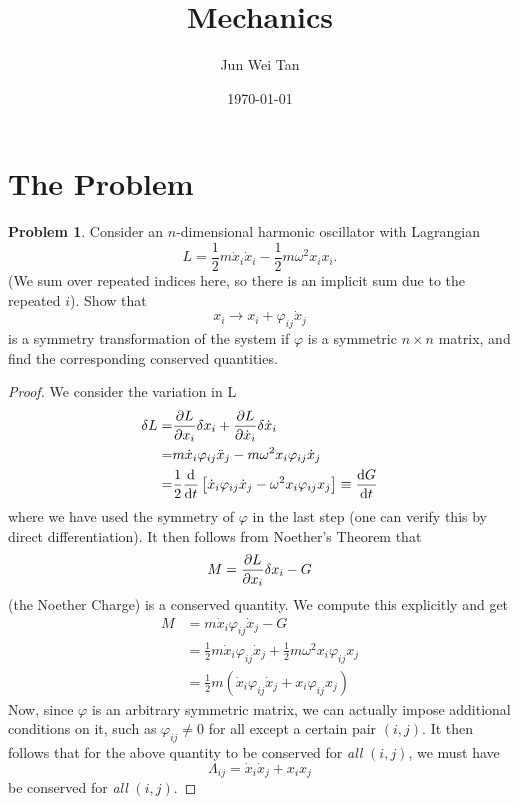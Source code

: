 \documentclass[prb,12pt]{revtex4-2}
\theoremstyle{definition}
\newtheorem{Problem}{Problem}
\theoremstyle{definition}
\begin{document}
\title{Mechanics}
	\author{Jun Wei Tan}
	\date{\today}
	\maketitle
	\section{The Problem}
\begin{Problem}
	Consider an $n$-dimensional harmonic oscillator with Lagrangian
	\[
		L=\frac{1}{2}m\dot{x}_i\dot{x}_i-\frac{1}{2}m\omega^2x_ix_i
	.\] 
	(We sum over repeated indices here, so there is an implicit sum due to the repeated $i$). Show that
	\[
		x_i\to x_i+\varphi_{ij}\dot{x}_j
	\]
	is a symmetry transformation of the system if $\varphi$ is a symmetric $n\times n$ matrix, and find the corresponding conserved quantities.
\end{Problem}
\begin{proof}
	We consider the variation in L
	\begin{align*}
		\delta L=&\pdv{L}{x_i}\delta x_i+\pdv{L}{\dot{x}_i}\delta\dot{x}_i\\
		=&m\dot{x}_i\varphi_{ij}\ddot{x}_j-m\omega^2x_i\varphi_{ij}\dot{x}_j\\
		=&\frac{1}{2}\dv{t}\left[ \dot{x}_i\varphi_{ij}\dot{x}_j-\omega^2 x_i\varphi_{ij}x_j \right]\equiv \dv{G}{t}
	\end{align*}
	where we have used the symmetry of $\varphi$ in the last step (one can verify this by direct differentiation). It then follows from Noether's Theorem that
	\[
		M=\pdv{L}{x_i}\delta x_i-G
	\] 
	(the Noether Charge) is a conserved quantity. We compute this explicitly and get
	\begin{align*}
		M&=m\dot{x}_i\varphi_{ij}\dot{x}_j-G\\
		 &=\frac{1}{2}m\dot{x}_i\varphi_{ij}\dot{x}_j+\frac{1}{2}m\omega^2 x_i\varphi_{ij}x_j\\
		 &=\frac{1}{2}m\left( \dot{x}_i\varphi_{ij}\dot{x}_j+x_i\varphi_{ij}x_j \right) 
	\end{align*}
	Now, since $\varphi$ is an arbitrary symmetric matrix, we can actually impose additional conditions on it, such as $\varphi_{ij}\neq 0$ for all except a certain pair $(i,j)$. It then follows that for the above quantity to be conserved for \emph{all} $(i,j)$, we must have
	\[
		\Lambda_{ij}=	\dot{x}_i\dot{x}_j+x_ix_j
	\]
	be conserved for \emph{all} $(i,j)$. \qedhere 
\end{proof}
\end{document}
